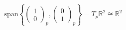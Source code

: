 \documentclass[preview]{standalone}
\begin{document}
\begin{align*}
\text{span}\left\{\begin{pmatrix}1\\ 0\end{pmatrix}_p, \begin{pmatrix}0\\ 1\end{pmatrix}_p\right\} = T_p\mathbb{R}^2 \cong \mathbb{R}^2
\end{align*}
\end{document}
